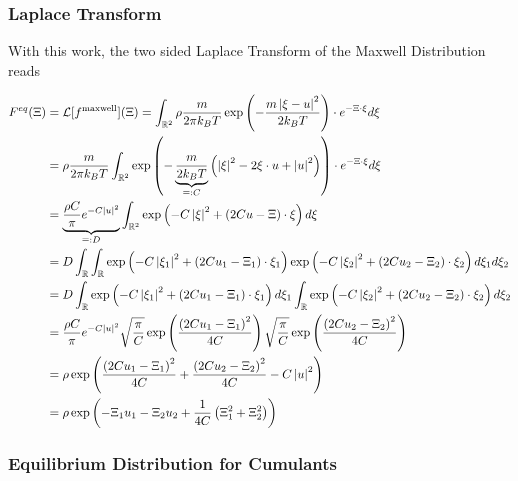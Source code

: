 \documentclass{article}
\begin{document}
\subsubsection{Laplace Transform}
\label{subs:Laplace Transform}
With this work, the two sided Laplace Transform of the Maxwell Distribution reads

\begin{equation}
  \begin{aligned}
    F^{eq}(\Xi) & = \mathcal{L}[f^{\text{maxwell}}](\Xi)
    = \int_{\mathbb{R}^2} \rho \frac{m}{2\pi k_B T} \exp \left( - \frac{m\left| \xi-u \right|^2}{2 k_B T}\right) \cdot e^{-\Xi\cdot\xi} d\xi \\
    & = \rho  \frac{m}{2\pi k_B T} \int_{\mathbb{R}^2}
      \exp \left( - \underbrace{\frac{m}{2 k_B T}}_{\mathrel{\mathop=}: C} \left( \left| \xi \right|^2 - 2\xi\cdot u + \left| u \right|^2 \right)\right) \cdot e^{-\Xi\cdot\xi} d\xi \\
    & = \underbrace{\frac{\rho C} {\pi} e^{-C \left| u \right|^2}}_{\mathrel{\mathop=}: D}
      \int_{\mathbb{R}^2}
      \exp \left( - C\left| \xi \right|^2 + (2Cu -\Xi)\cdot\xi \right) d\xi \\
    & =  D
      \int_{\mathbb{R}} \int_{\mathbb{R}}
      \exp \left( - C\left| \xi_1 \right|^2 + (2Cu_1 -\Xi_1)\cdot\xi_1 \right)
      \exp \left( - C\left| \xi_2 \right|^2 + (2Cu_2 -\Xi_2)\cdot\xi_2 \right) d\xi_1 d\xi_2 \\
    & = D
      \int_{\mathbb{R}}
      \exp \left( - C\left| \xi_1 \right|^2 + (2Cu_1 -\Xi_1)\cdot\xi_1 \right) d\xi_1
      \int_{\mathbb{R}}
      \exp \left( - C\left| \xi_2 \right|^2 + (2Cu_2 -\Xi_2)\cdot\xi_2 \right) d\xi_2 \\
    & = \frac{\rho C} {\pi} e^{-C \left| u \right|^2}
      \sqrt{\frac{\pi}{C}}\exp \left( \frac{{(2Cu_1-\Xi_1)}^2}{4C}\right)
      \sqrt{\frac{\pi}{C}}\exp \left( \frac{{(2Cu_2-\Xi_2)}^2}{4C}\right) \\
    & = \rho
      \exp \left( \frac{{(2Cu_1-\Xi_1)}^2}{4C} + \frac{{(2Cu_2-\Xi_2)}^2}{4C} -C \left| u \right|^2 \right) \\
    & = \rho
      \exp \left( -\Xi_1 u_1 - \Xi_2 u_2 + \frac{1}{4C}\left(\Xi_1^2 + \Xi_2^2 \right)\right)
  \end{aligned}
\end{equation}

\subsubsection{Equilibrium Distribution for Cumulants}
\label{subs:Equilibrium Distribution for Cumulants}
\end{document}
